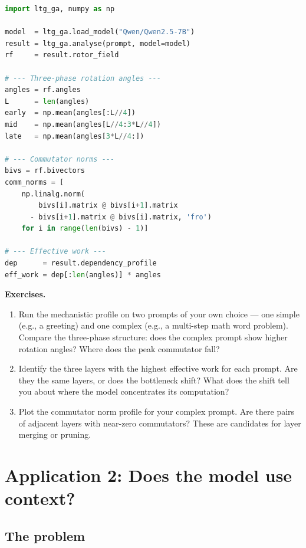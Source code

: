 \documentclass[11pt, twoside, openright]{memoir}
\numberwithin{equation}{chapter}
\begin{document}
\begin{lstlisting}[language=Python]
import ltg_ga, numpy as np

model  = ltg_ga.load_model("Qwen/Qwen2.5-7B")
result = ltg_ga.analyse(prompt, model=model)
rf     = result.rotor_field

# --- Three-phase rotation angles ---
angles = rf.angles
L      = len(angles)
early  = np.mean(angles[:L//4])
mid    = np.mean(angles[L//4:3*L//4])
late   = np.mean(angles[3*L//4:])

# --- Commutator norms ---
bivs = rf.bivectors
comm_norms = [
    np.linalg.norm(
        bivs[i].matrix @ bivs[i+1].matrix
      - bivs[i+1].matrix @ bivs[i].matrix, 'fro')
    for i in range(len(bivs) - 1)]

# --- Effective work ---
dep      = result.dependency_profile
eff_work = dep[:len(angles)] * angles
\end{lstlisting}

\begin{tryit}
\textbf{Exercises.}
\begin{enumerate}[nosep]
\item Run the mechanistic profile on two prompts of your own
  choice --- one simple (e.g., a greeting) and one complex (e.g., a
  multi-step math word problem).  Compare the three-phase
  structure: does the complex prompt show higher rotation angles?
  Where does the peak commutator fall?
\item Identify the three layers with the highest effective work for
  each prompt.  Are they the same layers, or does the bottleneck
  shift?  What does the shift tell you about where the model
  concentrates its computation?
\item Plot the commutator norm profile for your complex prompt.
  Are there pairs of adjacent layers with near-zero commutators?
  These are candidates for layer merging or pruning.
\end{enumerate}
\end{tryit}

\section{Application 2: Does the model use context?}
\label{sec:context-detection}

\subsection{The problem}
\end{document}
